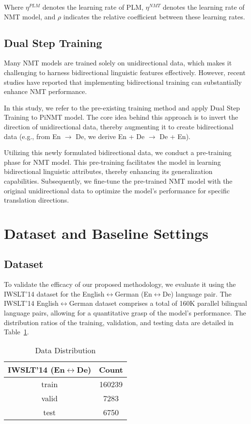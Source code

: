 \documentclass[conference]{IEEEtran}
\begin{document}
Where \( \eta^{PLM} \) denotes the learning rate of PLM, \( \eta^{NMT} \) denotes the learning rate of NMT model, and \( \rho \) indicates the relative coefficient between these learning rates.




\subsection{Dual Step Training}
Many NMT models are trained solely on unidirectional data, which makes it challenging to harness bidirectional linguistic features effectively. However, recent studies \cite{ding2021bidirectional, xu2021bibert} have reported that implementing bidirectional training can substantially enhance NMT performance.

In this study, we refer to the pre-existing training method \cite{xu2021bibert} and apply Dual Step Training to PiNMT model. The core idea behind this approach is to invert the direction of unidirectional data, thereby augmenting it to create bidirectional data (e.g., from En \( \to \) De, we derive En + De \( \to \) De + En).

Utilizing this newly formulated bidirectional data, we conduct a pre-training phase for NMT model. This pre-training facilitates the model in learning bidirectional linguistic attributes, thereby enhancing its generalization capabilities. Subsequently, we fine-tune the pre-trained NMT model with the original unidirectional data to optimize the model's performance for specific translation directions.


\section{Dataset and Baseline Settings}  
\subsection{Dataset}
To validate the efficacy of our proposed methodology, we evaluate it using the IWSLT’14 dataset \cite{cettolo2014iwslt} for the English$\leftrightarrow$German (En$\leftrightarrow$De) language pair. The IWSLT'14 English$\leftrightarrow$German dataset comprises a total of 160K parallel bilingual language pairs, allowing for a quantitative grasp of the model's performance. The distribution ratios of the training, validation, and testing data are detailed in Table~\ref{tab:dataset}. 

\begin{table}[b]
\centering
\caption{Data Distribution}
\label{tab:dataset}
\begin{tabular}{|c|c|}
\hline
\textbf{IWSLT'14 (En$\leftrightarrow$De)} & \textbf{Count} \\ \hline
train & 160239 \\ 
valid & 7283 \\ 
test & 6750 \\ \hline
\end{tabular}
\end{table}
\end{document}
